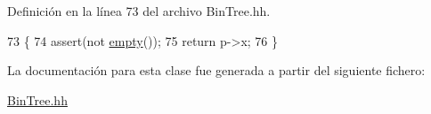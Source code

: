 Definición en la línea 73 del archivo Bin\+Tree.\+hh.


\begin{DoxyCode}
73                             \{
74         assert(not \hyperlink{class_bin_tree_a74cda259ba5c25b8ee38ed4dc33e4fad}{empty}());
75         \textcolor{keywordflow}{return} p->x;
76     \}
\end{DoxyCode}


La documentación para esta clase fue generada a partir del siguiente fichero\+:\begin{DoxyCompactItemize}
\item 
\hyperlink{_bin_tree_8hh}{Bin\+Tree.\+hh}\end{DoxyCompactItemize}
